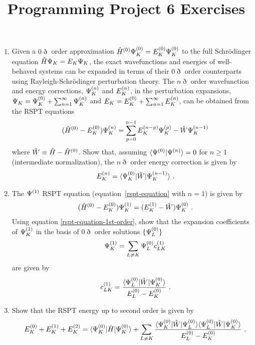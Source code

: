 \documentclass[fleqn,11pt]{article}
\title{Programming Project 6 Exercises}
\author{}
\date{}
\begin{document}
\maketitle

\begin{enumerate}
  \item
  Given a $0\eth$ order approximation $\hat{H}^{(0)}\Psi_K^{(0)}=E_K^{(0)}\Psi_K^{(0)}$ to the full Schr\"odinger equation $\hat{H}\Psi_K=E_K\Psi_K$, the exact wavefunctions and energies of well-behaved systems can be expanded in terms of their $0\eth$ order counterparts using Rayleigh-Schr\"odinger perturbation theory.
  The $n\eth$ order wavefunction and energy corrections, $\Psi_K^{(n)}$ and $E_K^{(n)}$, in the perturbation expansions, $\Psi_K=\Psi_K^{(0)}+\sum_{n=1}^{\infty}\Psi_K^{(n)}$ and $E_K=E_K^{(0)}+\sum_{n=1}^{\infty}E_K^{(n)}$, can be obtained from the RSPT equations
\begin{align}
\label{rspt-equation}
&&
  (\hat{H}^{(0)}-E_K^{(0)})\Psi^{(n)}_K
=
  \sum_{p=0}^{n-1}E^{(n-p)}_K\Psi^{(p)}_K
-
  \hat{W}\Psi^{(n-1)}_K
\end{align}
where $\hat{W}\equiv\hat{H}-\hat{H}^{(0)}$.
Show that, assuming $\langle\Psi^{(0)}|\Psi^{(n)}\rangle=0$ for $n\geq1$ (intermediate normalization), the $n\eth$ order energy correction is given by
\begin{align}
&&
  E^{(n)}_K
=
  \langle\Psi^{(0)}_K|\hat{W}|\Psi^{(n-1)}_K\rangle\ .
\end{align}


\item The $\Psi^{(1)}$ RSPT equation (equation~\ref{rspt-equation} with $n=1$) is given by
\begin{align}
\label{rspt-equation-1st-order}
&&
  (\hat{H}^{(0)}-E_K^{(0)})\Psi_K^{(1)}
=
  (E_K^{(1)}-\hat{W})\Psi_K^{(0)}\ .
\end{align}
Using equation \ref{rspt-equation-1st-order}, show that the expansion coefficients of $\Psi_K^{(1)}$ in the basis of $0\eth$ order solutions $\{\Psi_L^{(0)}\}$
\begin{align*}
&&
  \Psi_K^{(1)}
=
  \sum_{L\neq K}
  \Psi_L^{(0)} c_{LK}^{(1)}
\end{align*}
are given by
\begin{align}
&&
  c_{LK}^{(1)}
=
  \dfrac{\langle\Psi_L^{(0)}|\hat{W}|\Psi_K^{(0)}\rangle}{E_L^{(0)}-E_K^{(0)}}\ .
\end{align}

\item Show that the RSPT energy up to second order is given by
\begin{align}
&&
  E_K\ord{0}
+
  E_K\ord{1}
+
  E_K\ord{2}
=
  \ip{\Y_K\ord{0}|\op{H}|\Y_K\ord{0}}
+
  \sum_{L\neq K}
  \fr{\ip{\Y_K\ord{0}|\op{W}|\Y_L\ord{0}}\ip{\Y_L\ord{0}|\op{W}|\Y_K\ord{0}}}{E_L\ord{0}-E_K\ord{0}}\ .
\end{align}



\end{enumerate}
\end{document}
